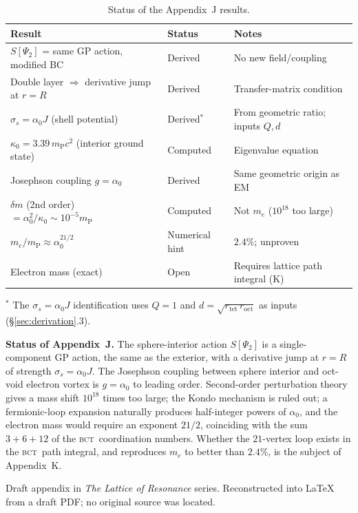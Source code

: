 \documentclass[aps,prl,preprint,superscriptaddress,floatfix]{revtex4-2}
\newcommand{\roct}{r_{\mathrm{oct}}}
\newcommand{\rtet}{r_{\mathrm{tet}}}
\newcommand{\az}{\alpha_0}
\newcommand{\mP}{m_{\mathrm{P}}}
\newcommand{\BCT}{\textsc{bct}}
\newcommand{\Psiint}{\Psi_2}
\newcommand{\Rsph}{R}
\begin{document}
\begin{table}[h]
\centering
\caption{Status of the Appendix~J results.}
\label{tab:summary}
\small
\begin{tabular}{lll}
\toprule
\textbf{Result} & \textbf{Status} & \textbf{Notes} \\
\midrule
$S[\Psiint]$ = same GP action, modified BC & Derived & No new field/coupling \\
Double layer $\Rightarrow$ derivative jump at $r=\Rsph$ & Derived & Transfer-matrix condition \\
$\sigma_s = \az J$ (shell potential) & Derived$^\ast$ & From geometric ratio; inputs $Q,d$ \\
$\kappa_0 = 3.39\,\mP c^2$ (interior ground state) & Computed & Eigenvalue equation \\
Josephson coupling $g=\az$ & Derived & Same geometric origin as EM \\
$\delta m$ (2nd order) $=\az^2/\kappa_0\sim10^{-5}\mP$ & Computed & Not $m_e$ ($10^{18}$ too large) \\
$m_e/\mP \approx \az^{21/2}$ & Numerical hint & $2.4\%$; unproven \\
Electron mass (exact) & Open & Requires lattice path integral (K) \\
\bottomrule
\end{tabular}
\end{table}

\noindent$^\ast$ The $\sigma_s=\az J$ identification uses $Q=1$ and
$d=\sqrt{\rtet\,\roct}$ as inputs (\S\ref{sec:derivation}.3).

\medskip

\noindent\textbf{Status of Appendix~J.} The sphere-interior action $S[\Psiint]$
is a single-component GP action, the same as the exterior, with a derivative
jump at $r=\Rsph$ of strength $\sigma_s=\az J$. The Josephson coupling between
sphere interior and oct-void electron vortex is $g=\az$ to leading order.
Second-order perturbation theory gives a mass shift $10^{18}$ times too large;
the Kondo mechanism is ruled out; a fermionic-loop expansion naturally produces
half-integer powers of $\az$, and the electron mass would require an exponent
$21/2$, coinciding with the sum $3+6+12$ of the \BCT\ coordination numbers.
Whether the $21$-vertex loop exists in the \BCT\ path integral, and reproduces
$m_e$ to better than $2.4\%$, is the subject of Appendix~K.

\begin{acknowledgments}
Draft appendix in \textit{The Lattice of Resonance} series. Reconstructed into
LaTeX from a draft PDF; no original source was located.
\end{acknowledgments}
\end{document}

